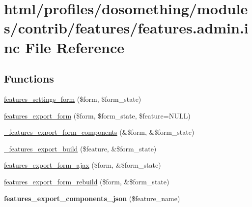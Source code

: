 \hypertarget{features_8admin_8inc}{
\section{html/profiles/dosomething/modules/contrib/features/features.admin.inc File Reference}
\label{features_8admin_8inc}
}
\subsection*{Functions}
\begin{DoxyCompactItemize}
\item 
\hyperlink{features_8admin_8inc_a13fe0f65db94a521da4528594b4b6a04}{features\_\-settings\_\-form} (\$form, \$form\_\-state)
\item 
\hyperlink{features_8admin_8inc_ac6d72d74ab676748b1197536446c1063}{features\_\-export\_\-form} (\$form, \$form\_\-state, \$feature=NULL)
\item 
\hyperlink{features_8admin_8inc_a1ac3eccd6829e3c5388179a22bdb9817}{\_\-features\_\-export\_\-form\_\-components} (\&\$form, \&\$form\_\-state)
\item 
\hyperlink{features_8admin_8inc_ae49cf45c928b2cf3a06100fce2021f4a}{\_\-features\_\-export\_\-build} (\$feature, \&\$form\_\-state)
\item 
\hyperlink{features_8admin_8inc_a0c79652184d03c394b6bccba1704d93d}{features\_\-export\_\-form\_\-ajax} (\$form, \&\$form\_\-state)
\item 
\hyperlink{features_8admin_8inc_a9d25b511fe410f560211cfa78edb08c2}{features\_\-export\_\-form\_\-rebuild} (\$form, \&\$form\_\-state)
\item 
\hypertarget{features_8admin_8inc_a29546f8ce6c126fdf9ccaae629a9962c}{
{\bfseries features\_\-export\_\-components\_\-json} (\$feature\_\-name)}
\label{features_8admin_8inc_a29546f8ce6c126fdf9ccaae629a9962c}


\end{DoxyCompactItemize}
